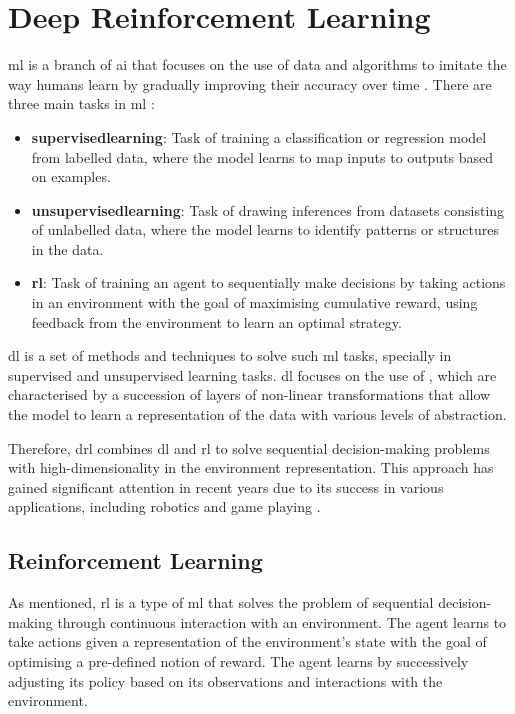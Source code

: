 \section{Deep Reinforcement Learning} \label{sec:deepreinforcementlearning}

\acrlong{ml} is a branch of \acrfull{ai} that focuses on the use of data and algorithms to imitate the way humans learn by gradually improving their accuracy over time \cite{IBM2021}. There are three main tasks in \acrshort{ml} \cite{Francois-Lavet2018}:

\begin{itemize}
    \item \textbf{\Gls{supervisedlearning}}: Task of training a classification or regression model from labelled data, where the model learns to map inputs to outputs based on examples.
    \item \textbf{\Gls{unsupervisedlearning}}: Task of drawing inferences from datasets consisting of unlabelled data, where the model learns to identify patterns or structures in the data.
    \item \textbf{\acrlong{rl}}: Task of training an agent to sequentially make decisions by taking actions in an environment with the goal of maximising cumulative reward, using feedback from the environment to learn an optimal strategy.
\end{itemize}

\acrlong{dl} is a set of methods and techniques to solve such \acrshort{ml} tasks, specially in supervised and unsupervised learning tasks. \acrshort{dl} focuses on the use of  \cite{Goodfellow2016}, which are characterised by a succession of layers of non-linear transformations that allow the model to learn a representation of the data with various levels of abstraction.

Therefore, \acrfull{drl} combines \acrfull{dl} and \acrfull{rl} to solve sequential decision-making problems with high-dimensionality in the environment representation. This approach has gained significant attention in recent years due to its success in various applications, including robotics \cite{Tang2024} and game playing \cite{Shao2019,Silver2016}.

\subsection{Reinforcement Learning} \label{sec:reinforcementlearning}

As mentioned, \acrshort{rl} is a type of \acrshort{ml} that solves the problem of sequential decision-making through continuous interaction with an environment. The agent learns to take actions given a representation of the environment's state with the goal of optimising a pre-defined notion of reward. The agent learns by successively adjusting its policy based on its observations and interactions with the environment. 

